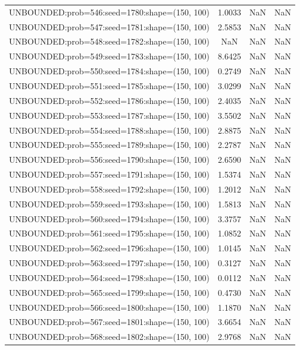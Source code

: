 \begin{longtable}{lccc}
UNBOUNDED:prob=546:seed=1780:shape=(150, 100) &  1.0033 &   NaN &    NaN \\
UNBOUNDED:prob=547:seed=1781:shape=(150, 100) &  2.5853 &   NaN &    NaN \\
UNBOUNDED:prob=548:seed=1782:shape=(150, 100) &     NaN &   NaN &    NaN \\
UNBOUNDED:prob=549:seed=1783:shape=(150, 100) &  8.6425 &   NaN &    NaN \\
UNBOUNDED:prob=550:seed=1784:shape=(150, 100) &  0.2749 &   NaN &    NaN \\
UNBOUNDED:prob=551:seed=1785:shape=(150, 100) &  3.0299 &   NaN &    NaN \\
UNBOUNDED:prob=552:seed=1786:shape=(150, 100) &  2.4035 &   NaN &    NaN \\
UNBOUNDED:prob=553:seed=1787:shape=(150, 100) &  3.5502 &   NaN &    NaN \\
UNBOUNDED:prob=554:seed=1788:shape=(150, 100) &  2.8875 &   NaN &    NaN \\
UNBOUNDED:prob=555:seed=1789:shape=(150, 100) &  2.2787 &   NaN &    NaN \\
UNBOUNDED:prob=556:seed=1790:shape=(150, 100) &  2.6590 &   NaN &    NaN \\
UNBOUNDED:prob=557:seed=1791:shape=(150, 100) &  1.5374 &   NaN &    NaN \\
UNBOUNDED:prob=558:seed=1792:shape=(150, 100) &  1.2012 &   NaN &    NaN \\
UNBOUNDED:prob=559:seed=1793:shape=(150, 100) &  1.5813 &   NaN &    NaN \\
UNBOUNDED:prob=560:seed=1794:shape=(150, 100) &  3.3757 &   NaN &    NaN \\
UNBOUNDED:prob=561:seed=1795:shape=(150, 100) &  1.0852 &   NaN &    NaN \\
UNBOUNDED:prob=562:seed=1796:shape=(150, 100) &  1.0145 &   NaN &    NaN \\
UNBOUNDED:prob=563:seed=1797:shape=(150, 100) &  0.3127 &   NaN &    NaN \\
UNBOUNDED:prob=564:seed=1798:shape=(150, 100) &  0.0112 &   NaN &    NaN \\
UNBOUNDED:prob=565:seed=1799:shape=(150, 100) &  0.4730 &   NaN &    NaN \\
UNBOUNDED:prob=566:seed=1800:shape=(150, 100) &  1.1870 &   NaN &    NaN \\
UNBOUNDED:prob=567:seed=1801:shape=(150, 100) &  3.6654 &   NaN &    NaN \\
UNBOUNDED:prob=568:seed=1802:shape=(150, 100) &  2.9768 &   NaN &    NaN \\

\end{longtable}

